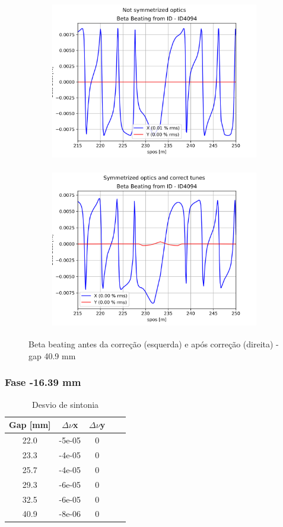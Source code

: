 \documentclass[a4paper,12pt]{article}
\begin{document}
\begin{figure}[H]
\begin{subfigure}{0.5\textwidth}
\includegraphics[width=0.9\linewidth, height=7cm]{figs/phase0 gap40 uncorrected-optics.png} 
\label{fig:subim1040}
\end{subfigure}
\begin{subfigure}{0.5\textwidth}
\includegraphics[width=0.9\linewidth, height=7cm]{figs/phase0 gap40 corrected-optics-tunes.png}
\label{fig:subim2040}
\end{subfigure}
\caption{Beta beating antes da correção (esquerda) e após correção (direita) - gap 40.9 mm}
\label{fig:bb0_40}
\end{figure}

\subsubsection{Fase -16.39 mm}

\begin{table}[H]
\centering
\caption{Desvio de sintonia}
\begin{tabular}{|c|c|c|c|c|}
\hline
Gap {[}mm{]} & $\Delta \nu$x & $\Delta \nu$y\\ \hline
22.0 & -5e-05 & 0\\ \hline
23.3 & -4e-05 & 0\\ \hline
25.7 & -4e-05 & 0\\ \hline
29.3 & -6e-05 & 0\\ \hline
32.5 & -6e-05 & 0 \\ \hline
40.9 & -8e-06 & 0\\ \hline
\end{tabular}
\label{tab:coropt-16}
\end{table}
\end{document}
